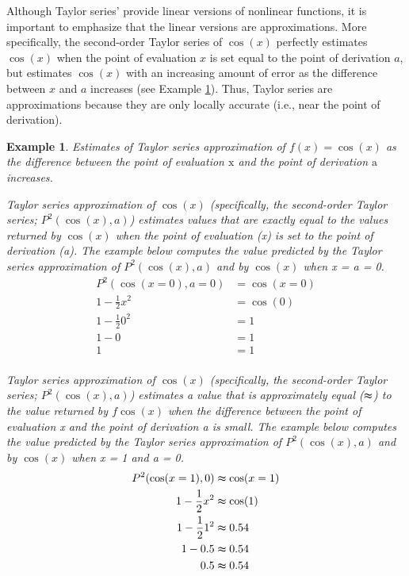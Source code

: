 \documentclass[
12pt, %
twoside,
english]{guelphthesis}
\newtheorem{example}{Example}
\begin{document}
Although Taylor series' provide linear versions of nonlinear functions, it is important to emphasize that the linear versions are approximations. More specifically, the second-order Taylor series of \(\cos(x)\)
perfectly estimates \(\cos(x)\) when the point of evaluation \(x\) is set
equal to the point of derivation \(a\), but estimates \(\cos(x)\) with an
increasing amount of error as the difference between \(x\) and \(a\)
increases (see Example \ref{exm:taylor-estimates}). Thus, Taylor series are approximations because they are only locally accurate (i.e., near the point of derivation).
\begin{example}
\protect\hypertarget{exm:taylor-estimates}{}\label{exm:taylor-estimates}Estimates of Taylor series approximation of \(f(x) = \cos(x)\) as the difference between the point of evaluation \(\mathrm{x}\) and the point of derivation \(\mathrm{a}\) increases.

\textup{Taylor series approximation of $\cos(x)$ (specifically, the second-order Taylor series; $P^2(\cos(x), a)$) estimates values that are exactly equal to the values returned by $\cos(x)$ when the point of evaluation (\textit{x}) is set to the point of derivation (\textit{a}). The example below computes the value predicted by the Taylor series approximation of $P^2(\cos(x), a)$ and by $\cos(x)$ when \textit{x} = \textit{a} = 0.}
\begin{align*}
P^2(\cos(x=0), a=0) &= \cos(x=0) \nonumber \\ 
1- \frac{1}{2}x^2 &=  \cos(0) \nonumber \\ 
1- \frac{1}{2}0^2 &=  1 \nonumber \\ 
1- 0 &=  1 \nonumber \\ 
1 &=  1 \nonumber \\ 
\end{align*}
\vspace*{-25mm}

\textup{Taylor series approximation of $\cos(x)$ (specifically, the second-order Taylor series; $P^2(\cos(x), a)$) estimates a value that is approximately equal ($\thickapprox$) to the value returned by $f\cos(x)$ when the difference between the point of evaluation \textit{x} and the point of derivation \textit{a} is small. The example below computes the value predicted by the Taylor series approximation of $P^2(\cos(x), a)$ and by $\cos(x)$ when \textit{x} = 1 and  \textit{a} = 0.}
\begin{align*}
P^2(\cos(x = 1), 0) &\thickapprox \cos(x = 1) \nonumber \\ 
1- \frac{1}{2}x^2 &\thickapprox   \cos(1) \nonumber \\ 
1- \frac{1}{2}1^2 &\thickapprox   0.54 \nonumber \\ 
1- 0.5 &\thickapprox   0.54 \nonumber \\ 
0.5 &\thickapprox 0.54 \nonumber \\ 
\end{align*}
\vspace*{-25mm}


\end{example}
\end{document}
